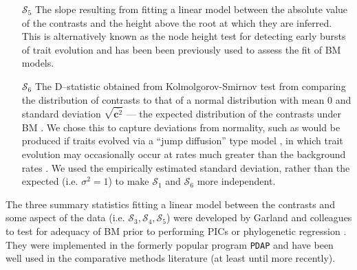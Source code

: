 \documentclass[a4paper,12pt]{article}
\begin{document}
\begin{enumerate}
\item[$\mathcal{S}_5$] The slope resulting from fitting a linear model between the absolute value of the contrasts and the height above the root at which they are inferred. This is alternatively known as the node height test \citep{FreckletonHarvey2006, SlaterPennell} for detecting early bursts of trait evolution and has been been previously used to assess the fit of BM models.

\item[$\mathcal{S}_6$] The D--statistic obtained from Kolmolgorov-Smirnov test from comparing the distribution of contrasts to that of a normal distribution with mean 0 and standard deviation $\sqrt{\overline{\mathbf{c}^2}}$ --- the expected distribution of the contrasts under BM \citep{Felsenstein1985, Rohlf2001}. We chose this to capture deviations from normality, such as would be produced if traits evolved via a ``jump diffusion'' type model \citep{Landis2012, Eastmanlevy}, in which trait evolution may occasionally occur at rates much greater than the background rates \citep[see][]{PennellPE}. We used the empirically estimated standard deviation, rather than the expected (i.e. $\sigma^2=1$) to make $\mathcal{S}_1$ and $\mathcal{S}_6$ more independent.

\end{enumerate}

The three summary statistics fitting a linear model between the contrasts and some aspect of the data (i.e. $\mathcal{S}_3, \mathcal{S}_4, \mathcal{S}_5$) were developed by Garland and colleagues \citep{Garland1992, Garland1993,  Diaz1996} to test for adequacy of BM prior to performing PICs \citep{Felsenstein1985} or phylogenetic regression \citep{Grafen1989}. They were implemented in the formerly popular program \texttt{PDAP} \citep{Garland1993, Midford2005} and have been well used in the comparative methods literature (at least until more recently).
\end{document}
